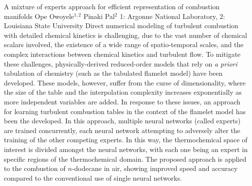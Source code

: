 \begin{addmargin}[2em]{0em}
\vspace{2ex}
\abs
{A mixture of experts approach for efficient representation of combustion manifolds}
{Ope Owoyele$^{1,2}$ Pinaki Pal$^2$}
{1: Argonne National Laboratory, 2: Louisiana State University}
{Direct numerical modeling of turbulent combustion with detailed chemical kinetics is challenging, due to the vast number of chemical scalars involved, the existence of a wide range of spatio-temporal scales, and the complex interactions between chemical kinetics and turbulent flow. To mitigate these challenges, physically-derived reduced-order models that rely on \textit{a priori} tabulation of chemistry (such as the tabulated flamelet model) have been developed. These models, however, suffer from the curse of dimensionality, where the size of the table and the interpolation complexity increases exponentially as more independent variables are added. In response to these issues, an approach for learning turbulent combustion tables in the context of the flamelet model has been the developed. In this approach, multiple neural networks (called experts) are trained concurrently, each neural network attempting to adversely alter the training of the other competing experts. In this way, the thermochemical space of interest is divided amongst the neural networks, with each one being an expert in specific regions of the thermochemical domain. The proposed approach is applied to the combustion of $n$-dodecane in air, showing improved speed and accuracy compared to the conventional use of single neural networks.}



\end{addmargin}
